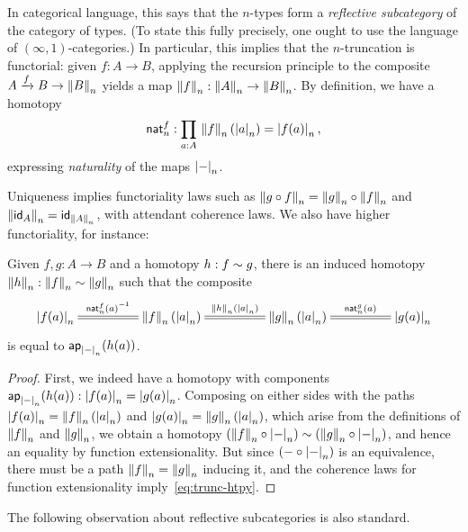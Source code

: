 In categorical language, this says that the $n$-types form a \emph{reflective subcategory} of the category of types.
(To state this fully precisely, one ought to use the language of $(\infty,1)$-categories.)
In particular, this implies that the $n$-truncation is functorial:
given $f:A\to B$, applying the recursion principle to the composite $A\xrightarrow{f} B \to \trunc n B$ yields a map $\trunc n f: \trunc n A \to \trunc n B$.
By definition, we have a homotopy
\begin{equation}
  \mathsf{nat}^f_n : \prd{a:A} \trunc n f(\tproj n a) = \tproj n {f(a)},\label{eq:trunc-nat}
\end{equation}
expressing \emph{naturality} of the maps $\tproj n-$.

Uniqueness implies functoriality laws such as $\trunc n {g\circ f} = \trunc n g \circ \trunc n f$ and $\trunc n{\idfunc[A]} = \idfunc[\trunc n A]$, with attendant coherence laws.
We also have higher functoriality, for instance:

\begin{lem}\label{thm:trunc-htpy}
  Given $f,g:A\to B$ and a homotopy $h:f\htpy g$, there is an induced homotopy $\trunc n h : \trunc n f \htpy \trunc n g$ such that the composite
  \begin{equation}
    \xymatrix@C=4pc{\tproj n{f(a)} \ar@{=}[r]^-{\opp{\mathsf{nat}^f_n(a)}} &
      \trunc n f(\tproj n a) \ar@{=}[r]^-{\trunc n h(\tproj na)} &
      \trunc n g(\tproj n a) \ar@{=}[r]^-{\mathsf{nat}^g_n(a)} &
      \tproj n{g(a)}}\label{eq:trunc-htpy}
  \end{equation}
  is equal to $\apfunc{\tproj n-}(h(a))$.
\end{lem}
\begin{proof}
  First, we indeed have a homotopy with components $\apfunc{\tproj n-}(h(a)) : \tproj n{f(a)} = \tproj n{g(a)}$.
  Composing on either sides with the paths $\tproj n{f(a)} = \trunc n f(\tproj n a)$ and $\tproj n{g(a)} = \trunc n g(\tproj n a)$, which arise from the definitions of $\trunc n f$ and $\trunc ng$, we obtain a homotopy $(\trunc n f \circ \tproj n-) \htpy (\trunc n g \circ \tproj n-)$, and hence an equality by function extensionality.
  But since $(-\circ \tproj n-)$ is an equivalence, there must be a path $\trunc nf = \trunc ng$ inducing it, and the coherence laws for function extensionality imply~\eqref{eq:trunc-htpy}.
\end{proof}

The following observation about reflective subcategories is also standard.

